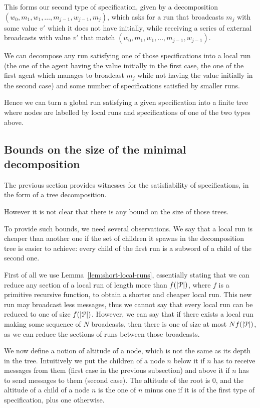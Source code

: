 \begin{itemize}
	This forms our second type of specification, given by a decomposition $(w_0, m_1, w_1, \ldots, m_{j-1}, w_{j-1}, m_j)$, which asks for a run that broadcasts $m_j$ with some value $v'$ which it does not have initially, while receiving a series of  external broadcasts with value $v'$ that match $(w_0, m_1, w_1, \ldots, m_{j-1}, w_{j-1})$.
\end{itemize}   

We can decompose any run satisfying one of those specifications into a local run (the one of the agent having the value initially in the first case, the one of the first agent which manages to broadcast $m_j$ while not having the value initially in the second case) and some number of specifications satisfied by smaller runs.

Hence we can turn a global run satisfying a given specification into a finite tree where nodes are labelled by local runs and specifications of one of the two types above.

\subsection{Bounds on the size of the minimal decomposition}

The previous section provides witnesses for the satisfiability of specifications, in the form of a tree decomposition.

However it is not clear that there is any bound on the size of those trees.

To provide such bounds, we need several observations.
We say that a local run is cheaper than another one if the set of children it spawns in the decomposition tree is easier to achieve: every child of the first run is a subword of a child of the second one.

 First of all we use Lemma~\ref{lem:short-local-runs}, essentially stating that we can reduce any section of a local run of length more than $f(|\mathcal{P}|)$, where $f$ is a primitive recursive function, to obtain a shorter and cheaper local run.
 This new run may broadcast less messages, thus we cannot say that every local run can be reduced to one of size $f(|\mathcal{P}|)$.
 However, we can say that if there exists a local run making some sequence of $N$ broadcasts, then there is one of size at most $Nf(|\mathcal{P}|)$, as we can reduce the sections of runs between those broadcasts.
 
 We now define a notion of altitude of a node, which is not the same as its depth in the tree. Intuitively we put the children of a node $n$ below it if $n$ has to receive messages from them (first case in the previous subsection) and above it if $n$ has to send messages to them (second case).
 The altitude of the root is $0$, and the altitude of a child of a node $n$  is  the one of $n$ minus one if it is of the first type of specification, plus one otherwise.
 
